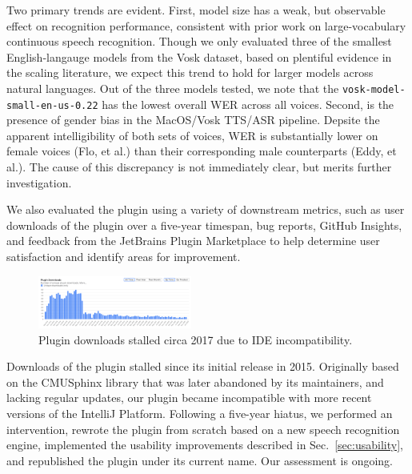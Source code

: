 \documentclass[conference]{IEEEtran}
\begin{document}
Two primary trends are evident. First, model size has a weak, but observable effect on recognition performance, consistent with prior work on large-vocabulary continuous speech recognition. Though we only evaluated three of the smallest English-langauge models from the Vosk dataset, based on plentiful evidence in the scaling literature, we expect this trend to hold for larger models across natural languages. Out of the three models tested, we note that the \texttt{vosk-model-small-en-us-0.22} has the lowest overall WER across all voices. Second, is the presence of gender bias in the MacOS/Vosk TTS/ASR pipeline. Depsite the apparent intelligibility of both sets of voices, WER is substantially lower on female voices (Flo, et al.) than their corresponding male counterparts (Eddy, et al.). The cause of this discrepancy is not immediately clear, but merits further investigation.

We also evaluated the plugin using a variety of downstream metrics, such as user downloads of the plugin over a five-year timespan, bug reports, GitHub Insights, and feedback from the JetBrains Plugin Marketplace to help determine user satisfaction and identify areas for improvement.

\begin{figure}[ht!]
    \centering
    \includegraphics[width=0.45\textwidth]{downloads.png}
    \caption{Plugin downloads stalled circa 2017 due to IDE incompatibility.}
\end{figure}

Downloads of the plugin stalled since its initial release in 2015. Originally based on the CMUSphinx library that was later abandoned by its maintainers, and lacking regular updates, our plugin became incompatible with more recent versions of the IntelliJ Platform. Following a five-year hiatus, we performed an intervention, rewrote the plugin from scratch based on a new speech recognition engine, implemented the usability improvements described in Sec.~\ref{sec:usability}, and republished the plugin under its current name. Our assessment is ongoing.

\end{document}
